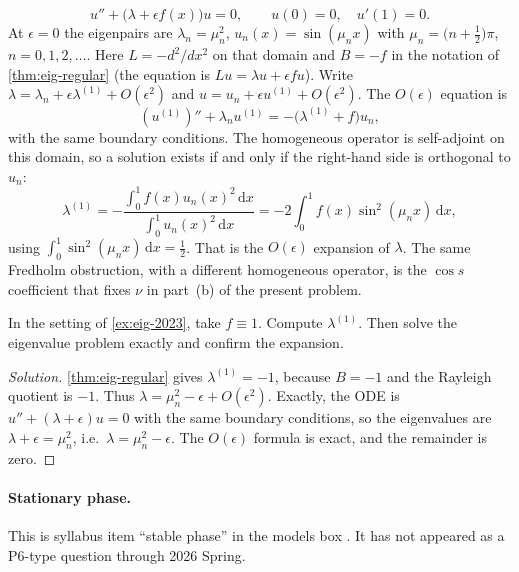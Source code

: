 \documentclass[11pt,a4paper]{article}
\begin{document}
\begin{example}
\label{ex:eig-2023}
\[
u''+\bigl(\lambda+\epsilon f(x)\bigr)u=0,
\qquad
u(0)=0,\quad u'(1)=0.
\]
At \(\epsilon=0\) the eigenpairs are \(\lambda_{n}=\mu_{n}^{2}\), \(u_{n}(x)=\sin(\mu_{n}x)\) with \(\mu_{n}=\bigl(n+\tfrac12\bigr)\pi\), \(n=0,1,2,\ldots\). Here \(L=-d^{2}/dx^{2}\) on that domain and \(B=-f\) in the notation of \cref{thm:eig-regular} (the equation is \(Lu=\lambda u+\epsilon f u\)). Write \(\lambda=\lambda_{n}+\epsilon\lambda^{(1)}+O(\epsilon^{2})\) and \(u=u_{n}+\epsilon u^{(1)}+O(\epsilon^{2})\). The \(O(\epsilon)\) equation is
\[
(u^{(1)})''+\lambda_{n}u^{(1)}
=
-\bigl(\lambda^{(1)}+f\bigr)u_{n},
\]
with the same boundary conditions. The homogeneous operator is self-adjoint on this domain, so a solution exists if and only if the right-hand side is orthogonal to \(u_{n}\):
\[
\lambda^{(1)}
=
-\frac{\int_{0}^{1}f(x)u_{n}(x)^{2}\,\mathrm{d}x}{\int_{0}^{1}u_{n}(x)^{2}\,\mathrm{d}x}
=
-2\int_{0}^{1}f(x)\sin^{2}(\mu_{n}x)\,\mathrm{d}x,
\]
using \(\int_{0}^{1}\sin^{2}(\mu_{n}x)\,\mathrm{d}x=\frac12\). That is the \(O(\epsilon)\) expansion of \(\lambda\). The same Fredholm obstruction, with a different homogeneous operator, is the \(\cos s\) coefficient that fixes \(\nu\) in part~(b) of the present problem.
\end{example}

\begin{exercise}
\label{exer:eig-f1}
In the setting of \cref{ex:eig-2023}, take \(f\equiv 1\). Compute \(\lambda^{(1)}\). Then solve the eigenvalue problem exactly and confirm the expansion.
\end{exercise}

\begin{proof}[Solution]
\cref{thm:eig-regular} gives \(\lambda^{(1)}=-1\), because \(B=-1\) and the Rayleigh quotient is \(-1\). Thus \(\lambda=\mu_{n}^{2}-\epsilon+O(\epsilon^{2})\). Exactly, the ODE is \(u''+(\lambda+\epsilon)u=0\) with the same boundary conditions, so the eigenvalues are \(\lambda+\epsilon=\mu_{n}^{2}\), i.e.\ \(\lambda=\mu_{n}^{2}-\epsilon\). The \(O(\epsilon)\) formula is exact, and the remainder is zero.
\end{proof}

\paragraph{Stationary phase.}

This is syllabus item ``stable phase'' in the models box \cite{bender99}. It has not appeared as a P6-type question through 2026 Spring.
\end{document}
